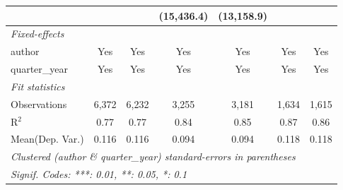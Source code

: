 \begin{tabular}{lcccccc}
                                         &               &               & (15,436.4)     & (13,158.9)     &                &   \\   
   \midrule
   \emph{Fixed-effects}\\
   author                                & Yes           & Yes           & Yes            & Yes            & Yes            & Yes\\  
   quarter\_year                         & Yes           & Yes           & Yes            & Yes            & Yes            & Yes\\  
   \midrule
   \emph{Fit statistics}\\
   Observations                          & 6,372         & 6,232         & 3,255          & 3,181          & 1,634          & 1,615\\  
   R$^2$                                 & 0.77          & 0.77          & 0.84           & 0.85           & 0.87           & 0.86\\  
Mean(Dep. Var.) & 0.116 & 0.116 & 0.094 & 0.094 & 0.118 & 0.118 \\
   \midrule \midrule
   \multicolumn{7}{l}{\emph{Clustered (author \& quarter\_year) standard-errors in parentheses}}\\
   \multicolumn{7}{l}{\emph{Signif. Codes: ***: 0.01, **: 0.05, *: 0.1}}\\
\end{tabular}
\par\endgroup
